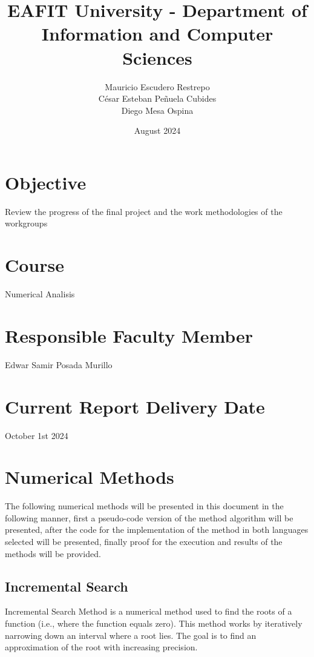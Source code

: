 \documentclass{article}
\title{EAFIT University - Department of Information and Computer Sciences}
\author{Mauricio Escudero Restrepo \\
        César Esteban Peñuela Cubides \\
        Diego Mesa Ospina}
\date{August 2024}
\begin{document}
\maketitle

\section{Objective}
Review the progress of the final project and the work methodologies of the workgroups

\section{Course}
Numerical Analisis

\section{Responsible Faculty Member}
Edwar Samir Posada Murillo

\section{Current Report Delivery Date}
October 1st 2024

\section[]{Numerical Methods}
    The following numerical methods will be presented in this document in the following manner, first a pseudo-code
    version of the method algorithm will be presented, after the code for the implementation of the method in both
    languages selected will be presented, finally proof for the execution and results of the methods will be provided.

    \subsection{Incremental Search}

    Incremental Search Method is a numerical method used to find the roots of a function
    (i.e., where the function equals zero).
    This method works by iteratively narrowing down an interval where a root
    lies.
    The goal is to find an approximation of the root with increasing precision.
\end{document}
